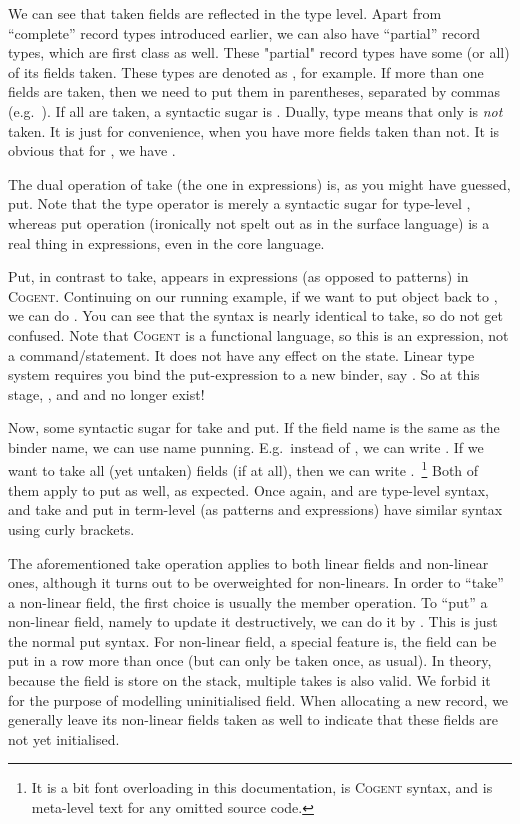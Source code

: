 \documentclass[a4paper]{article}
\newcommand{\cogent}{\textsc{Cogent}\xspace}
\begin{document}
We can see that taken fields are reflected in the type level. Apart from ``complete'' record types introduced earlier, we can also
have ``partial'' record types, which are first class as well. These "partial" record types have
some (or all) of its fields taken. These types are denoted as , for example. If more than one fields are taken, then we need to put them in parentheses,
separated by commas (e.g.\ ). If all are taken, a syntactic sugar is . Dually, type  means that only  is
\emph{not} taken. It is just for convenience, when you have more fields taken than not. It is obvious that for , we have
.

The dual operation of take (the one in expressions) is, as you might have guessed, put. Note that the type operator
 is merely a syntactic sugar for type-level ,
whereas put operation (ironically not spelt out as  in the
surface language) is a real thing in expressions, even in the core language.

Put, in contrast to take, appears in expressions (as opposed to patterns) in \cogent. Continuing on our running example, if we want to put object  back to
, we can do . You can see that the syntax is nearly identical to take, so do not get confused.
Note that \cogent is a functional language, so this is an expression, not a command/statement. It does not have any effect on the state.
Linear type system requires you bind the put-expression to a new binder, say .
So at this stage, , and  and  no longer exist!

Now, some syntactic sugar for take and put. If the field name is the same as the binder name, we can use name punning. E.g.\ instead of
, we can write . If we want to take all (yet untaken) fields (if at all), then we can write
.~\footnote{It is a bit font overloading in this documentation,
 is \cogent syntax, and  is meta-level text for any omitted source code.}
Both of them apply to put as well, as expected. Once again,  and  are type-level
syntax, and take and put in term-level (as patterns and expressions) have similar syntax using curly brackets.

The aforementioned take operation applies to both linear fields and non-linear ones, although it turns out to be overweighted for non-linears. In order to ``take'' a non-linear field, the first
choice is usually the member operation. To ``put'' a non-linear field, namely to update it
destructively, we can do it by . This is just the normal
put syntax. For non-linear field, a special feature is, the field can be put
in a row more than once (but can only be taken once, as usual). In theory, because the field
is store on the stack, multiple takes is also valid. We forbid it for the purpose of modelling
uninitialised field. When allocating a new record, we generally leave its non-linear fields
taken as well to indicate that these fields are not yet initialised.
\end{document}
